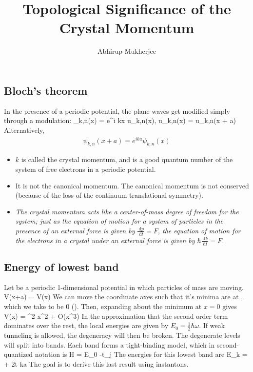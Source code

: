\documentclass[12pt]{article}
\title{Topological Significance of the Crystal Momentum}
\author{Abhirup Mukherjee}
\begin{document}
\maketitle
\subsection*{Bloch's theorem}
In the presence of a periodic potential, the plane waves get modified simply through a modulation:
\beq
\psi_{k,n}(x) = e^{i k\cdot x} u_{k,n}(x), \quad{}\quad u_{k,n}(x) = u_{k,n}(x + a)
\eeq
Alternatively,
\begin{equation}\begin{aligned}
	\label{Bloch}
	\psi_{k,n}(x + a) = e^{i k a} \psi_{k,n}(x)
\end{aligned}\end{equation}
\begin{itemize}
	\item \(k\) is called the crystal momentum, and is a good quantum number of the system of free electrons in a periodic potential.
	\item It is not the canonical momentum. The canonical momentum is not conserved (because of the loss of the continuum translational symmetry).
	\item \textit{The crystal momentum acts like a center-of-mass degree of freedom for the system; just as the equation of motion for a system of particles in the presence of an external force is given by \(\frac{\:\mathrm{d}p}{\:\mathrm{d}t} = F\), the equation of motion for the electrons in a crystal under an external force is given by \(\hbar \frac{\:\mathrm{d}k}{\:\mathrm{d}t} = F\).}
\end{itemize}

\subsection*{Energy of lowest band}
Let  be a periodic 1-dimensional potential in which particles of mass  are moving.
\beq
V(x+a) = V(x)
\eeq
We can move the coordinate axes such that it's minima are at , which we take to be 0 (). Then, expanding  about the minimum at \(x=0\) gives
\beq
V(x) = \omega^2 x^2 + O(x^3)
\eeq
In the approximation that the second order term dominates over the rest, the local energies are given by \(E_0 = \frac{1}{2}\hbar \omega\). If weak tunneling is allowed, the degeneracy will then be broken. The degenerate levels will split into bands. Each band forms a tight-binding model, which in second-quantized notation is
\beq
H = E_0 -t\sum_j 
\eeq
The energies for this lowest band are
\beq
E_k = \hbar\omega + 2t \cos ka
\eeq
The goal is to derive this last result using instantons.
\end{document}
